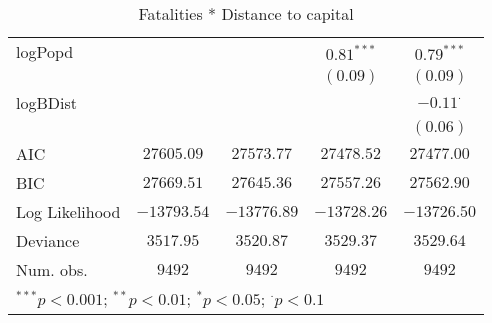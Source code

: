 \begin{sidewaystable}
\begin{center}
{\begin{tabular}{l c c c c}
logPopd              &                &               & $0.81^{***}$    & $0.79^{***}$    \\
                     &                &               & $(0.09)$        & $(0.09)$        \\
logBDist             &                &               &                 & $-0.11^{\cdot}$ \\
                     &                &               &                 & $(0.06)$        \\
\hline
AIC                  & $27605.09$     & $27573.77$    & $27478.52$      & $27477.00$      \\
BIC                  & $27669.51$     & $27645.36$    & $27557.26$      & $27562.90$      \\
Log Likelihood       & $-13793.54$    & $-13776.89$   & $-13728.26$     & $-13726.50$     \\
Deviance             & $3517.95$      & $3520.87$     & $3529.37$       & $3529.64$       \\
Num. obs.            & $9492$         & $9492$        & $9492$          & $9492$          \\
\hline
\multicolumn{5}{l}{\scriptsize{$^{***}p<0.001$; $^{**}p<0.01$; $^{*}p<0.05$; $^{\cdot}p<0.1$}}
\end{tabular}
}
\caption{Fatalities * Distance to capital}
\label{interaction_statebaseddeaths}
\end{center}
\end{sidewaystable}
